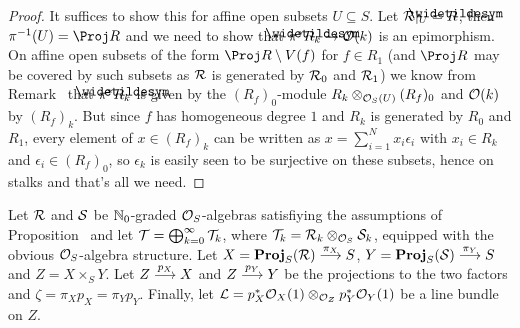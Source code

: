 \documentclass[a4paper,parskip=half,numbers=enddot, DIV=12]{scrreprt}
\begin{document}
\begin{proof}
	It suffices to show this for affine open subsets $U\subseteq S$. Let $\Rr|_U=\snake{R}$, then $\pi^{-1}(U)=\Proj R$ and we need to show that $\pi^*\snake{R}_k\morphism\Oo(k)$ is an epimorphism. On affine open subsets of the form $\Proj R\setminus V(f)$ for $f\in R_1$ (and $\Proj R$ may be covered by such subsets as $\mathcal{R}$ is generated by $\mathcal{R}_0$ and $\mathcal{R}_1$) we know from Remark~ that $\pi^*\snake{R}_k$ is given by the $(R_f)_0$-module $R_k\otimes_{\mathcal{O}_S(U)}(R_f)_0$ and $\mathcal{O}(k)$ by $(R_f)_k$. But since $f$ has homogeneous degree $1$ and $R_k$ is generated by $R_0$ and $R_1$, every element of $x\in (R_f)_k$ can be written as $x=\sum_{i=1}^Nx_i\epsilon_i$ with $x_i\in R_k$ and $\epsilon_i\in (R_f)_0$, so $\epsilon_k$ is easily seen to be surjective on these subsets, hence on stalks and that's all we need.
\end{proof}
Let $\mathcal{R}$ and $\mathcal{S}$ be $\mathbb{N}_0$-graded $\mathcal{O}_S$-algebras satisfiying the assumptions of Proposition~ and let $\mathcal{T}=\bigoplus_{k=0}^\infty\mathcal{T}_k$, where $\mathcal{T}_k=\mathcal{R}_k\otimes_{\mathcal{O}_S}\mathcal{S}_k$, equipped with the obvious $\mathcal{O}_S$-algebra structure. Let $X=\PROJ_S(\Rr)\morphism[\pi_X]S$, $Y=\PROJ_S(\Ss)\morphism[\pi_Y]S$ and $Z=X\times_SY$. Let $Z\morphism[p_X]X$ and $Z\morphism[p_Y]Y$ be the projections to the two factors and $\zeta=\pi_Xp_X=\pi_Yp_Y$. Finally, let $\mathcal{L}=p_X^*\mathcal{O}_X(1)\otimes_{\mathcal{O}_Z}p_Y^*\mathcal{O}_Y(1)$ be a line bundle on $Z$.
\end{document}
